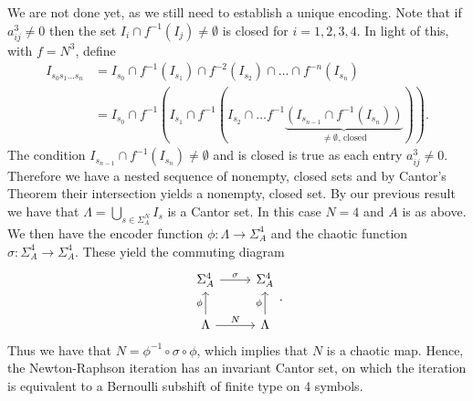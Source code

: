 We are not done yet, as we still need to establish a unique encoding. Note that if $a^{3}_{ij}\neq 0$ then the set $I_{i}\cap f^{-1}(I_j)\neq \emptyset$ is closed for $i=1,2,3,4$. In light of this, with $f=N^3$, define
\begin{align}
	I_{s_0s_1 \ldots s_n} &= I_{s_0} \cap f^{-1}(I_{s_1}) \cap f^{-2}(I_{s_2}) \cap \ldots \cap f^{-n}(I_{s_n}) \\
			      &= I_{s_0} \cap f^{-1}\left(I_{s_1} \cap f^{-1}\left( I_{s_2} \cap \ldots f^{-1}\underbrace{\left(I_{s_{n-1}}\cap f^{-1}(I_{s_n})\right) }_{\neq\emptyset \textrm{, closed} }\right) \right).
\end{align}
The condition $I_{s_{n-1}}\cap f^{-1}(I_{s_n})\neq \emptyset$ and is closed is true as each entry $a^{3}_{ij}\neq 0$. Therefore we have a nested sequence of nonempty, closed sets and by Cantor's Theorem their intersection yields a nonempty, closed set. By our previous result we have that $\Lambda= \bigcup_{s\in \Sigma^{N}_{A}}I_{s}$ is a Cantor set. In this case $N=4$ and $A$ is as above. We then have the encoder function $\phi:\Lambda \to \Sigma_{A}^{4}$ and the chaotic function $\sigma:\Sigma_{A}^{4}\to \Sigma_{A}^{4}$. These yield the commuting diagram
\begin{equation}
\begin{tikzcd}
	\Sigma_{A}^{4} \arrow[r, "\sigma"] 
& \Sigma_{A}^{4} \\
\Lambda \arrow[u,"\phi"] \arrow[r, "N"]
& \Lambda \arrow[u, "\phi"] 
\end{tikzcd}.
\end{equation}
Thus we have that $N=\phi^{-1}\circ \sigma \circ \phi$, which implies that $N$ is a chaotic map. Hence, the Newton-Raphson iteration has an invariant Cantor set, on which the iteration is equivalent to a Bernoulli subshift of finite type on 4 symbols.
